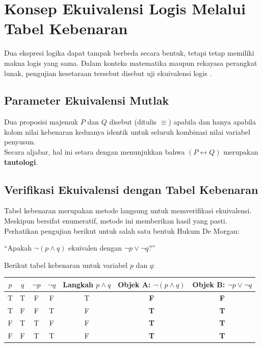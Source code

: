 \section{Konsep Ekuivalensi Logis Melalui Tabel Kebenaran}

Dua ekspresi logika dapat tampak berbeda secara bentuk, tetapi tetap memiliki makna logis yang sama. Dalam konteks matematika maupun rekayasa perangkat lunak, pengujian kesetaraan tersebut disebut uji ekuivalensi logis \cite{rosen2019}.

\subsection{Parameter Ekuivalensi Mutlak}

\begin{definisi}
Dua proposisi majemuk $P$ dan $Q$ disebut  (ditulis $\equiv$) apabila dan hanya apabila kolom nilai kebenaran keduanya identik untuk seluruh kombinasi nilai variabel penyusun. \\
Secara aljabar, hal ini setara dengan menunjukkan bahwa $(P \leftrightarrow Q)$ merupakan \textbf{tautologi}.
\end{definisi}

\subsection{Verifikasi Ekuivalensi dengan Tabel Kebenaran}

Tabel kebenaran merupakan metode langsung untuk memverifikasi ekuivalensi. Meskipun bersifat enumeratif, metode ini memberikan hasil yang pasti. Perhatikan pengujian berikut untuk salah satu bentuk Hukum De Morgan:
\begin{center}
``Apakah $\neg(p \wedge q)$ ekuivalen dengan $\neg p \vee \neg q$?''
\end{center}

Berikut tabel kebenaran untuk variabel $p$ dan $q$:

\begin{table}[H]
\centering
\begin{tabular}{|c|c||c|c||c|c||c|}
\hline
\textbf{$p$} & \textbf{$q$} & \textbf{$\neg p$} & \textbf{$\neg q$} & \textbf{Langkah $p \wedge q$} & \textbf{Objek A: $\neg(p \wedge q)$} & \textbf{Objek B: $\neg p \vee \neg q$} \\
\hline
T & T & F & F & T & \textbf{F} & \textbf{F} \\
T & F & F & T & F & \textbf{T} & \textbf{T} \\
F & T & T & F & F & \textbf{T} & \textbf{T} \\
F & F & T & T & F & \textbf{T} & \textbf{T} \\
\hline
\end{tabular}
\end{table}

